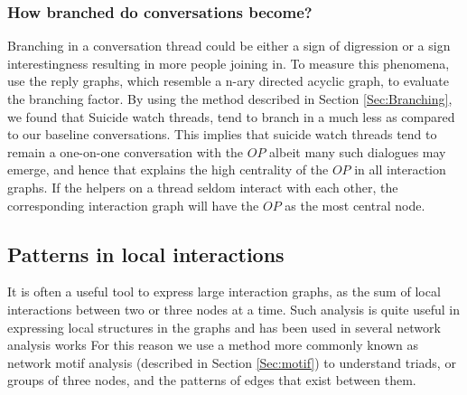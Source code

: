 \subsubsection{How branched do conversations become?}
Branching in a conversation thread could be either a sign of digression or a sign interestingness resulting in more people joining in. To measure this phenomena, use the reply graphs, which resemble a n-ary directed acyclic graph, to evaluate the branching factor. By using the method described in Section \ref{Sec:Branching}, we found that Suicide watch threads, tend to branch in a much less as compared to our baseline conversations. This implies that suicide watch threads tend to remain a one-on-one conversation with the $OP$ albeit many such dialogues may emerge, and hence that explains the high centrality of the $OP$ in all interaction graphs. If the helpers on a thread seldom interact with each other, the corresponding interaction graph will have the $OP$ as the most central node.


\subsection{Patterns in local interactions}
It is often a useful tool to express large interaction graphs, as the sum of local interactions between two or three nodes at a time. Such analysis is quite useful in expressing local structures in the graphs and has been used in several network analysis works 
For this reason we use a method more commonly known as network motif analysis (described in Section \ref{Sec:motif}) to understand triads, or groups of three nodes, and the patterns of edges that exist between them. 

